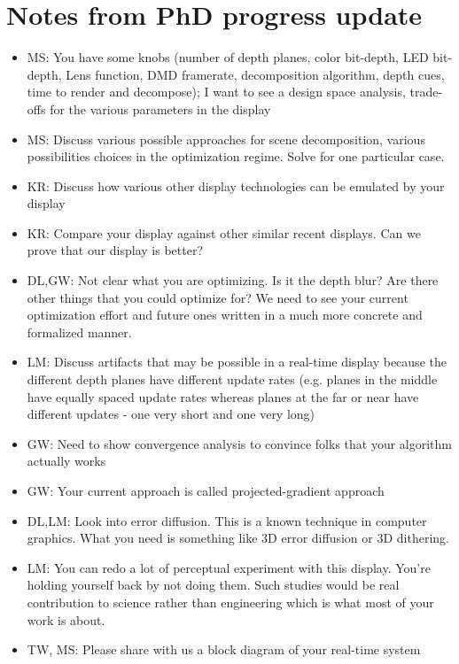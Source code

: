 \section{Notes from PhD progress update}
\begin{itemize}
\item MS: You have some knobs (number of depth planes, color bit-depth, LED bit-depth, Lens function, DMD framerate, decomposition algorithm, depth cues, time to render and decompose); I want to see a design space analysis, trade-offs for the various parameters in the display
\item MS: Discuss various possible approaches for scene decomposition, various possibilities choices in the optimization regime. Solve for one particular case.
\item KR: Discuss how various other display technologies can be emulated by your display
\item KR: Compare your display against other similar recent displays. Can we prove that our display is better?
\item DL,GW: Not clear what you are optimizing. Is it the depth blur? Are there other things that you could optimize for? We need to see your current optimization effort and future ones written in a much more concrete and formalized manner. 
\item LM: Discuss artifacts that may be possible in a real-time display because the different depth planes have different update rates (e.g. planes in the middle have equally spaced update rates whereas planes at the far or near have different updates - one very short and one very long)
\item GW: Need to show convergence analysis to convince folks that your algorithm actually works
\item GW: Your current approach is called projected-gradient approach
\item DL,LM: Look into error diffusion. This is a known technique in computer graphics. What you need is something like 3D error diffusion or 3D dithering.
\item LM: You can redo a lot of perceptual experiment with this display. You're holding yourself back by not doing them. Such studies would be real contribution to science rather than engineering which is what most of your work is about.
\item TW, MS: Please share with us a block diagram of your real-time system
\end{itemize}

